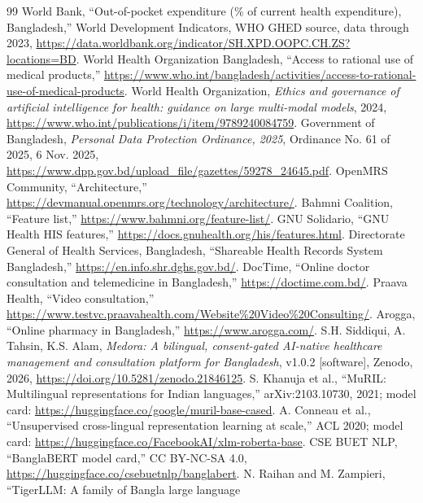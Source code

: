 \documentclass[12pt,twocolumn,a4paper]{article}
\begin{document}
\balance
\scriptsize
\begin{thebibliography}{99}
\setlength{\itemsep}{0pt}\setlength{\parsep}{0pt}
 World Bank, ``Out-of-pocket expenditure (\% of current health expenditure),
Bangladesh,'' World Development Indicators, WHO GHED source, data through 2023,
\url{https://data.worldbank.org/indicator/SH.XPD.OOPC.CH.ZS?locations=BD}.
 World Health Organization Bangladesh, ``Access to rational use of
medical products,'' \url{https://www.who.int/bangladesh/activities/access-to-rational-use-of-medical-products}.
 World Health Organization, \emph{Ethics and governance of artificial
intelligence for health: guidance on large multi-modal models}, 2024,
\url{https://www.who.int/publications/i/item/9789240084759}.
 Government of Bangladesh, \emph{Personal Data Protection Ordinance, 2025},
Ordinance No. 61 of 2025, 6 Nov. 2025,
\url{https://www.dpp.gov.bd/upload_file/gazettes/59278_24645.pdf}.
 OpenMRS Community, ``Architecture,''
\url{https://devmanual.openmrs.org/technology/architecture/}.
 Bahmni Coalition, ``Feature list,''
\url{https://www.bahmni.org/feature-list/}.
 GNU Solidario, ``GNU Health HIS features,''
\url{https://docs.gnuhealth.org/his/features.html}.
 Directorate General of Health Services, Bangladesh, ``Shareable Health
Records System Bangladesh,'' \url{https://en.info.shr.dghs.gov.bd/}.
 DocTime, ``Online doctor consultation and telemedicine in Bangladesh,''
\url{https://doctime.com.bd/}.
 Praava Health, ``Video consultation,''
\url{https://www.testvc.praavahealth.com/Website\%20Video\%20Consulting/}.
 Arogga, ``Online pharmacy in Bangladesh,''
\url{https://www.arogga.com/}.
 S.H. Siddiqui, A. Tahsin, K.S. Alam, \emph{Medora: A bilingual,
consent-gated AI-native healthcare management and consultation platform for Bangladesh},
v1.0.2 [software], Zenodo, 2026, \url{https://doi.org/10.5281/zenodo.21846125}.
 S. Khanuja et al., ``MuRIL: Multilingual representations for Indian
languages,'' arXiv:2103.10730, 2021; model card: \url{https://huggingface.co/google/muril-base-cased}.
 A. Conneau et al., ``Unsupervised cross-lingual representation learning at
scale,'' ACL 2020; model card: \url{https://huggingface.co/FacebookAI/xlm-roberta-base}.
 CSE BUET NLP, ``BanglaBERT model card,'' CC BY-NC-SA 4.0,
\url{https://huggingface.co/csebuetnlp/banglabert}.
 N. Raihan and M. Zampieri, ``TigerLLM: A family of Bangla large language

\end{thebibliography}
\end{document}

